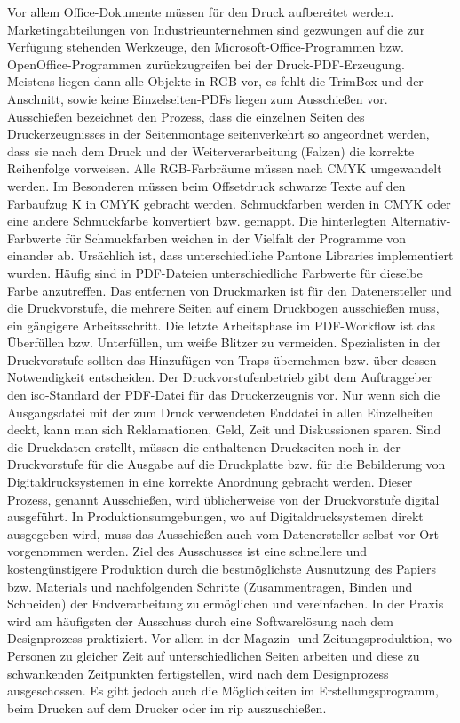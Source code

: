 Vor allem Office-Dokumente müssen für den Druck aufbereitet werden. Marketingabteilungen von Industrieunternehmen sind gezwungen auf die zur Verfügung stehenden Werkzeuge, den Microsoft-Office-Programmen bzw. OpenOffice-Programmen zurückzugreifen bei der Druck-PDF-Erzeugung. Meistens liegen dann alle Objekte in RGB vor, es fehlt die TrimBox und der Anschnitt, sowie keine Einzelseiten-PDFs liegen zum Ausschießen vor. \cite{schneeberger}
Ausschießen bezeichnet den Prozess, dass die einzelnen Seiten des Druckerzeugnisses in der Seitenmontage seitenverkehrt so angeordnet werden, dass sie nach dem Druck und der Weiterverarbeitung (Falzen) die korrekte Reihenfolge vorweisen. \cite{kompendium}
Alle RGB-Farbräume müssen nach CMYK umgewandelt werden. Im Besonderen müssen beim Offsetdruck schwarze Texte auf den Farbaufzug K in CMYK gebracht werden. Schmuckfarben werden in CMYK oder eine andere Schmuckfarbe konvertiert bzw. gemappt. Die hinterlegten Alternativ-Farbwerte für Schmuckfarben weichen in der Vielfalt der Programme von einander ab. Ursächlich ist, dass unterschiedliche Pantone Libraries implementiert wurden. Häufig sind in PDF-Dateien unterschiedliche Farbwerte für dieselbe Farbe anzutreffen. Das entfernen von Druckmarken ist für den Datenersteller und die Druckvorstufe, die mehrere Seiten auf einem Druckbogen ausschießen muss, ein gängigere Arbeitsschritt. Die letzte Arbeitsphase im PDF-Workflow ist das Überfüllen bzw. Unterfüllen, um weiße Blitzer zu vermeiden. Spezialisten in der Druckvorstufe sollten das Hinzufügen von Traps übernehmen bzw. über dessen Notwendigkeit entscheiden. Der Druckvorstufenbetrieb gibt dem Auftraggeber den \gls{iso}-Standard der PDF-Datei für das Druckerzeugnis vor. Nur wenn sich die Ausgangsdatei mit der zum Druck verwendeten Enddatei in allen Einzelheiten deckt, kann man sich Reklamationen, Geld, Zeit und Diskussionen sparen. Sind die Druckdaten erstellt, müssen die enthaltenen Druckseiten noch in der Druckvorstufe für die Ausgabe auf die Druckplatte bzw. für die Bebilderung von Digitaldrucksystemen in eine korrekte Anordnung gebracht werden. Dieser Prozess, genannt Ausschießen, wird üblicherweise von der Druckvorstufe digital ausgeführt. In Produktionsumgebungen, wo auf Digitaldrucksystemen direkt ausgegeben wird, muss das Ausschießen auch vom Datenersteller selbst vor Ort vorgenommen werden. Ziel des Ausschusses ist eine schnellere und kostengünstigere Produktion durch die bestmöglichste Ausnutzung des Papiers bzw. Materials und nachfolgenden Schritte (Zusammentragen, Binden und Schneiden) der Endverarbeitung zu ermöglichen und vereinfachen. In der Praxis wird am häufigsten der Ausschuss durch eine Softwarelösung nach dem Designprozess praktiziert. Vor allem in der Magazin- und Zeitungsproduktion, wo Personen zu gleicher Zeit auf unterschiedlichen Seiten arbeiten und diese zu schwankenden Zeitpunkten fertigstellen, wird nach dem Designprozess ausgeschossen. Es gibt jedoch auch die Möglichkeiten im Erstellungsprogramm, beim Drucken auf dem Drucker oder im \gls{rip} auszuschießen.
\cite{schneeberger}

